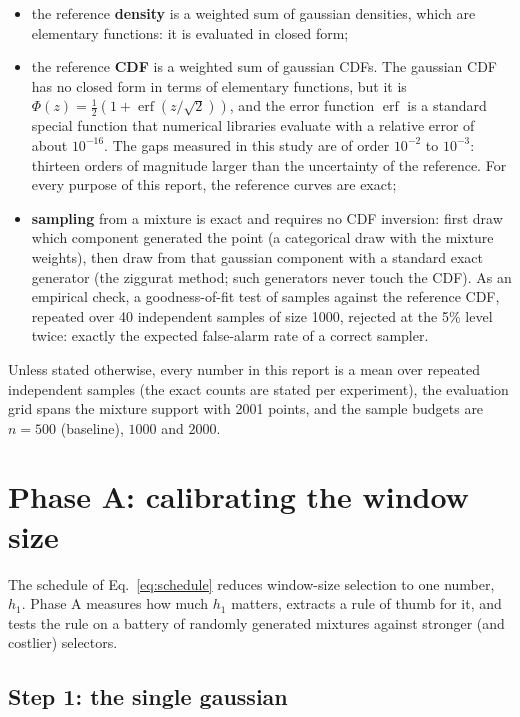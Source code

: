 \documentclass[11pt]{article}
\begin{document}
\begin{itemize}
  \item the reference \textbf{density} is a weighted sum of gaussian densities, which are
        elementary functions: it is evaluated in closed form;
  \item the reference \textbf{CDF} is a weighted sum of gaussian CDFs. The gaussian CDF has
        no closed form in terms of elementary functions, but it is
        $\Phi(z) = \tfrac12(1 + \operatorname{erf}(z/\sqrt2))$, and the error function
        $\operatorname{erf}$ is a standard special function that numerical libraries
        evaluate with a relative error of about $10^{-16}$. The gaps measured in this study
        are of order $10^{-2}$ to $10^{-3}$: thirteen orders of magnitude larger than the
        uncertainty of the reference. For every purpose of this report, the reference
        curves are exact;
  \item \textbf{sampling} from a mixture is exact and requires no CDF inversion: first draw
        which component generated the point (a categorical draw with the mixture weights),
        then draw from that gaussian component with a standard exact generator (the
        ziggurat method; such generators never touch the CDF). As an empirical check, a
        goodness-of-fit test of samples against the reference CDF, repeated over 40
        independent samples of size 1000, rejected at the 5\% level twice: exactly the
        expected false-alarm rate of a correct sampler.
\end{itemize}

Unless stated otherwise, every number in this report is a mean over repeated independent
samples (the exact counts are stated per experiment), the evaluation grid spans the mixture
support with 2001 points, and the sample budgets are $n = 500$ (baseline), $1000$ and
$2000$.

\section{Phase A: calibrating the window size}

The schedule of Eq.~\eqref{eq:schedule} reduces window-size selection to one number, $h_1$.
Phase A measures how much $h_1$ matters, extracts a rule of thumb for it, and tests the rule
on a battery of randomly generated mixtures against stronger (and costlier) selectors.

\subsection{Step 1: the single gaussian}
\label{sec:gauss}
\end{document}
